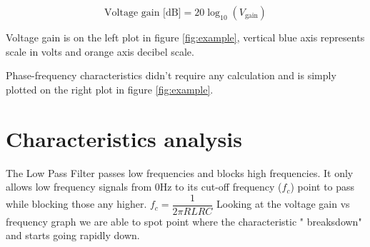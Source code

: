 \documentclass[notitlepage, a4paper, 11pt]{article}
\begin{document}
	\begin{equation}
		\text{Voltage gain [dB]} = 20 \log_{10}(V_{\text{gain}})
	\end{equation}
	
	Voltage gain is on the left plot in figure \ref{fig:example}, vertical blue axis represents scale in volts and orange axis decibel scale.
	
	Phase-frequency characteristics didn't require any calculation and is simply plotted on the right plot in figure \ref{fig:example}.
	
	\section{Characteristics analysis}
	
	The Low Pass Filter passes low frequencies and blocks high frequencies.	It only allows low frequency signals from 0Hz to its cut-off frequency ($f_c$) point to pass while blocking those any higher. $f_c=\dfrac{1}{2\pi RL RC}$ Looking at the voltage gain vs frequency graph we are able to spot point where the characteristic " breaksdown" and starts going rapidly down.
	
\end{document}
